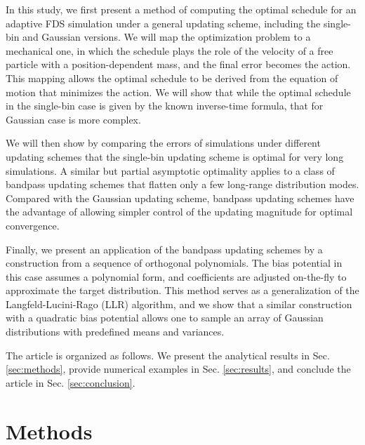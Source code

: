 \documentclass[reprint, superscriptaddress, floatfix]{revtex4-1}
\begin{document}
In this study,
we first present a method of computing
the optimal schedule
for an adaptive FDS simulation
under a general updating scheme,
including the single-bin and Gaussian versions.
%
We will map the optimization problem to a mechanical one,
in which the schedule plays the role of the velocity of
a free particle with a position-dependent mass,
and the final error becomes the action.
%
This mapping allows the optimal schedule
to be derived from the equation of motion
that minimizes the action.
%
%
We will show that
while the optimal schedule in the single-bin case
is given by the known inverse-time formula,
that for Gaussian case is more complex.

We will then show by comparing the errors
of simulations under different updating schemes
that the single-bin updating scheme
is optimal for very long simulations.
%
A similar but partial asymptotic optimality applies to
a class of bandpass updating schemes
that flatten only
a few long-range distribution modes.
%
Compared with the Gaussian updating scheme,
bandpass updating schemes have the advantage of allowing
simpler control of the updating magnitude
for optimal convergence.

Finally, we present an application of
the bandpass updating schemes
by a construction from
a sequence of orthogonal polynomials.
%
The bias potential in this case assumes
a polynomial form,
and coefficients are adjusted on-the-fly
to approximate the target distribution.
%
This method serves
as a generalization of the Langfeld-Lucini-Rago (LLR)
algorithm\cite{langfeld2012, pellegrini2014},
and we show that
a similar construction with
a quadratic bias potential\cite{neuhaus2006, *neuhaus2007, zhu2012}
allows one to sample an array of Gaussian distributions
with predefined means and variances.

The article is organized as follows.
%
We present the analytical results in Sec. \ref{sec:methods},
provide numerical examples
in Sec. \ref{sec:results},
and conclude the article
in Sec. \ref{sec:conclusion}.




\section{\label{sec:methods}
Methods}
\end{document}
